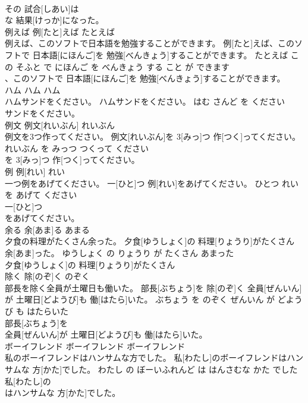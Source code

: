 \documentclass[8pt]{extreport}
\begin{document}
\begin{CJK}{UTF8}{min}
\\	その 試合[しあい]は
\\	な 結果[けっか]になった。		
\\	例えば	例[たと]えば	たとえば	
\\	例えば、このソフトで日本語を勉強することができます。	例[たと]えば、このソフトで 日本語[にほんご]を 勉強[べんきょう]することができます。	たとえば この そふと で にほんご を べんきょう する こと が できます	
\\	、このソフトで 日本語[にほんご]を 勉強[べんきょう]することができます。		
\\	ハム	ハム	ハム	
\\	ハムサンドをください。	ハムサンドをください。	はむ さんど を ください	
\\	サンドをください。		
\\	例文	例文[れいぶん]	れいぶん	
\\	例文を3つ作ってください。	例文[れいぶん]を 3[みっ]つ 作[つく]ってください。	れいぶん を みっつ つくって ください	
\\	を 3[みっ]つ 作[つく]ってください。		
\\	例	例[れい]	れい	
\\	一つ例をあげてください。	一[ひと]つ 例[れい]をあげてください。	ひとつ れい を あげて ください	
\\	一[ひと]つ
\\	をあげてください。		
\\	余る	余[あま]る	あまる	
\\	夕食の料理がたくさん余った。	夕食[ゆうしょく]の 料理[りょうり]がたくさん 余[あま]った。	ゆうしょく の りょうり が たくさん あまった	
\\	夕食[ゆうしょく]の 料理[りょうり]がたくさん
\\	除く	除[のぞ]く	のぞく	
\\	部長を除く全員が土曜日も働いた。	部長[ぶちょう]を 除[のぞ]く 全員[ぜんいん]が 土曜日[どようび]も 働[はたら]いた。	ぶちょう を のぞく ぜんいん が どようび も はたらいた	
\\	部長[ぶちょう]を
\\	全員[ぜんいん]が 土曜日[どようび]も 働[はたら]いた。		
\\	ボーイフレンド	ボーイフレンド	ボーイフレンド	
\\	私のボーイフレンドはハンサムな方でした。	私[わたし]のボーイフレンドはハンサムな 方[かた]でした。	わたし の ぼーいふれんど は はんさむな かた でした	
\\	私[わたし]の
\\	はハンサムな 方[かた]でした。		

\end{CJK}
\end{document}
